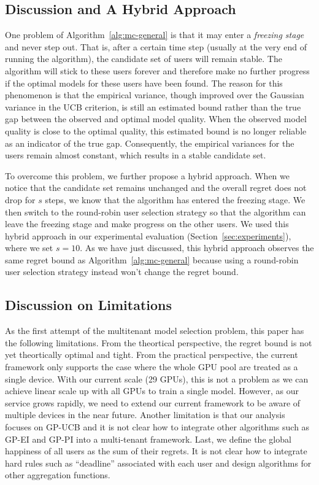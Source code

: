 \documentclass[letterpaper]{vldb}
\begin{document}
\subsection{Discussion and A Hybrid Approach}

One problem of Algorithm~\ref{alg:mc-general} is that it may enter a \emph{freezing stage} and never step out.
That is, after a certain time step (usually at the very end of running the algorithm), the candidate set of users will remain stable.
The algorithm will stick to these users forever and therefore make no further progress if the optimal models for these users have been found.
The reason for this phenomenon is that the empirical variance, though improved over the Gaussian variance in the UCB criterion, is still an estimated bound rather than the true gap between the observed and optimal model quality.
When the observed model quality is close to the optimal quality, this estimated bound is no longer reliable as an indicator of the true gap.
Consequently, the empirical variances for the users remain almost constant, which results in a stable candidate set.

To overcome this problem, we further propose a hybrid approach.
When we notice that the candidate set remains unchanged and the overall regret does not drop for $s$ steps,
we know that the algorithm has entered the freezing stage.
We then switch to the round-robin user selection strategy so that the algorithm can leave the freezing stage and make progress on the other users.
We used this hybrid approach in our experimental evaluation (Section~\ref{sec:experiments}), where we set $s=10$.
As we have just discussed, this hybrid approach observes the same regret bound as Algorithm~\ref{alg:mc-general} because using a round-robin user selection strategy instead won't change the regret bound.


\subsection{Discussion on Limitations}

As the first attempt
of the multitenant model selection problem,
this paper has the following limitations.
From the theortical perspective, the regret bound
is not yet theortically optimal and tight.
From the practical perspective,
the current framework only supports the case where
the whole GPU pool are treated as a single device.
With our current scale (29 GPUs), this is not
a problem as we can achieve linear scale up
with all GPUs to train a single model. However, as our service grows
rapidly, we need to extend our current framework
to be aware of multiple devices in the near future.
Another limitation is that our
analysis focuses on GP-UCB and it is not clear
how to integrate other algorithms such as
GP-EI and GP-PI into a multi-tenant 
framework. Last, we define the global
happiness of all users as the sum 
of their regrets. It is not clear how to
integrate hard rules such as ``deadline''
associated with each user and design
algorithms for other aggregation functions.
\end{document}
